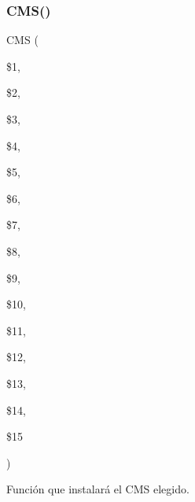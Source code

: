 \subsubsection{\texorpdfstring{C\+M\+S()}{CMS()}}
{\footnotesize\ttfamily C\+MS (\begin{DoxyParamCaption}\item[{}]{\$1,  }\item[{}]{\$2,  }\item[{}]{\$3,  }\item[{}]{\$4,  }\item[{}]{\$5,  }\item[{}]{\$6,  }\item[{}]{\$7,  }\item[{}]{\$8,  }\item[{}]{\$9,  }\item[{}]{\$10,  }\item[{}]{\$11,  }\item[{}]{\$12,  }\item[{}]{\$13,  }\item[{}]{\$14,  }\item[{}]{\$15 }\end{DoxyParamCaption})}



Función que instalará el C\+MS elegido. 


